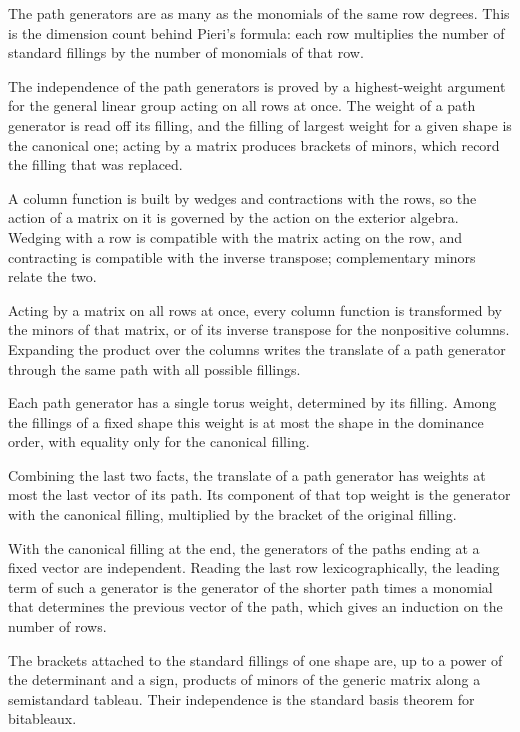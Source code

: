 The path generators are as many as the monomials of the same row degrees. This is the dimension count
behind Pieri's formula: each row multiplies the number of standard fillings by the number of monomials
of that row.

The independence of the path generators is proved by a highest-weight argument for the general linear
group acting on all rows at once. The weight of a path generator is read off its filling, and the
filling of largest weight for a given shape is the canonical one; acting by a matrix produces brackets of
minors, which record the filling that was replaced.

A column function is built by wedges and contractions with the rows, so the action of a matrix on it is
governed by the action on the exterior algebra. Wedging with a row is compatible with the matrix acting
on the row, and contracting is compatible with the inverse transpose; complementary minors relate the
two.

Acting by a matrix on all rows at once, every column function is transformed by the minors of that
matrix, or of its inverse transpose for the nonpositive columns. Expanding the product over the columns
writes the translate of a path generator through the same path with all possible fillings.

Each path generator has a single torus weight, determined by its filling. Among the fillings of a fixed
shape this weight is at most the shape in the dominance order, with equality only for the canonical
filling.

Combining the last two facts, the translate of a path generator has weights at most the last vector of
its path. Its component of that top weight is the generator with the canonical filling, multiplied by the
bracket of the original filling.

With the canonical filling at the end, the generators of the paths ending at a fixed vector are
independent. Reading the last row lexicographically, the leading term of such a generator is the
generator of the shorter path times a monomial that determines the previous vector of the path, which
gives an induction on the number of rows.

The brackets attached to the standard fillings of one shape are, up to a power of the determinant and a
sign, products of minors of the generic matrix along a semistandard tableau. Their independence is the
standard basis theorem for bitableaux.

